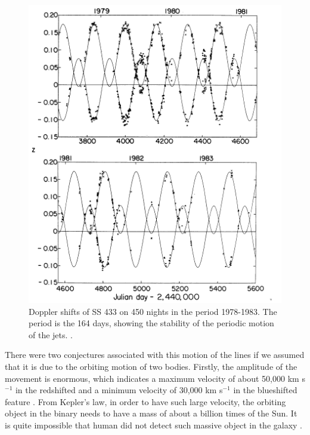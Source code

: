 \begin{figure}[ht]
    \centering
    \includegraphics[scale = 0.6]{Chapters/Figures/dopplershift.png}
    \caption{Doppler shifts of SS 433 on 450 nights in the period 1978-1983. The period is the 164 days, showing the stability of the periodic motion of the jets. \citep{Margon1984}.}
    
    \label{dopplershift}
\end{figure}

There were two conjectures associated with this motion of the lines if we assumed that it is due to the orbiting motion of two bodies. Firstly, the amplitude of the movement is enormous, which indicates a maximum velocity of about 50,000 km s$^{-1}$ in the redshifted and a minimum velocity of 30,000 km s$^{-1}$ in the blueshifted feature \citep{Margon1984}. From Kepler's law, in order to have such large velocity, the orbiting object in the binary needs to have a mass of about a billion times of the Sun. It is quite impossible that human did not detect such massive object in the galaxy \citep{seward_charles_2010}.\par 

